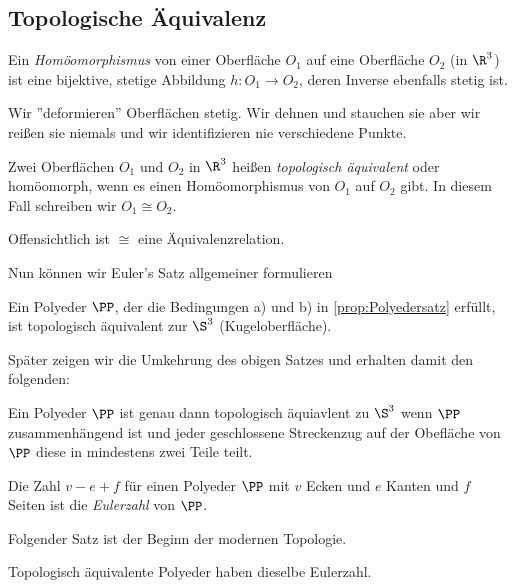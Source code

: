 \subsection{Topologische Äquivalenz}
\label{subsec:0.2}

\begin{defn}
Ein \emph{Homöomorphismus} von einer Oberfläche $O_1$ auf eine Oberfläche $O_2$
(in $\R^3$) ist eine bijektive, stetige Abbildung $h: O_1\to O_2$, deren Inverse
ebenfalls stetig ist.\fishhere
\end{defn}

\begin{propn}
Wir ''deformieren'' Oberflächen stetig. Wir dehnen und stauchen sie aber wir
reißen sie niemals und wir identifizieren nie verschiedene Punkte.\fishhere
\end{propn}

\begin{defn}
Zwei Oberflächen $O_1$ und $O_2$ in $\R^3$ heißen \emph{topologisch äquivalent}
oder homöomorph, wenn es einen Homöomorphismus von $O_1$ auf $O_2$ gibt. In
diesem Fall schreiben wir $O_1\cong O_2$.\fishhere
\end{defn}

Offensichtlich ist $\cong$ eine Äquivalenzrelation.

Nun können wir Euler's Satz allgemeiner formulieren
\begin{lem}
Ein Polyeder $\PP$, der die Bedingungen a) und b) in \ref{prop:Polyedersatz}
erfüllt, ist topologisch äquivalent zur $\S^3$ (Kugeloberfläche).\fishhere
\end{lem}

Später zeigen wir die Umkehrung des obigen Satzes und erhalten damit
den folgenden:
\begin{prop}
Ein Polyeder $\PP$ ist genau dann topologisch äquiavlent zu $\S^3$
wenn $\PP$ zusammenhängend ist und jeder geschlossene Streckenzug auf der
Obefläche von $\PP$ diese in mindestens zwei Teile teilt.\fishhere
\end{prop}

\begin{defn}
Die Zahl $v-e+f$ für einen Polyeder $\PP$ mit $v$ Ecken und $e$ Kanten und $f$
Seiten ist die \emph{Eulerzahl} von $\PP$.
\end{defn}

Folgender Satz ist der Beginn der modernen Topologie.
\begin{prop}
Topologisch äquivalente Polyeder haben dieselbe Eulerzahl.\fishhere
\end{prop}

